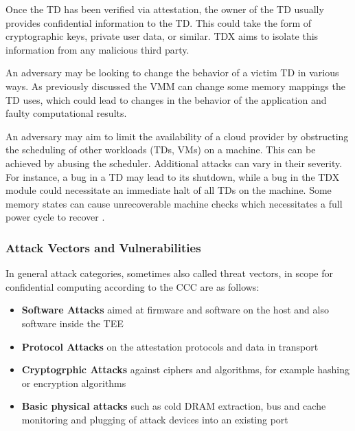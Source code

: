 Once the TD has been verified via attestation, the owner of the TD usually provides confidential information to the TD. This could take the form of cryptographic keys, private user data, or similar. TDX aims to isolate this information from any malicious third party.


An adversary may be looking to change the behavior of a victim TD in various ways. As previously discussed the VMM can change some memory mappings the TD uses, which could lead to changes in the behavior of the application and faulty computational results.


An adversary may aim to limit the availability of a cloud provider by obstructing the scheduling of other workloads (TDs, VMs) on a machine. This can be achieved by abusing the scheduler. Additional attacks can vary in their severity. For instance, a bug in a TD may lead to its shutdown, while a bug in the TDX module could necessitate an immediate halt of all TDs on the machine. Some memory states can cause unrecoverable machine checks which necessitates a full power cycle to recover \cite{aktas_intel_nodate}.

\subsubsection{Attack Vectors and Vulnerabilities}
In general attack categories, sometimes also called threat vectors, in scope for confidential computing according to the CCC are as follows:

\begin{itemize}
    \item \textbf{Software Attacks} aimed at firmware and software on the host and also software inside the TEE
    \item \textbf{Protocol Attacks} on the attestation protocols and data in transport
    \item \textbf{Cryptogrphic Attacks} against ciphers and algorithms, for example hashing or encryption algorithms
    \item \textbf{Basic physical attacks} such as \guillemotright cold DRAM extraction, bus and cache monitoring and plugging of attack devices into an existing port \guillemotleft \cite{confidential_computing_consortium_ccc--technical-analysis--confidential-computing-v13_unlockedpdf_2023}
\end{itemize}

